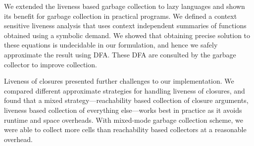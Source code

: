 \documentclass[preprint,9pt]{sigplanconf}
\begin{document}


We extended  the liveness  based garbage  collection to
lazy  languages  and  shown  its  benefit  for  garbage
collection in practical programs.  We defined a context
sensitive   liveness   analysis   that   uses   context
independent  summaries of  functions  obtained using  a
symbolic  demand.  We  showed  that  obtaining  precise
solution  to  these  equations is  undecidable  in  our
formulation, and hence we safely approximate the result
using  DFA.  These DFA  are  consulted  by the  garbage
collector to improve collection.

Liveness  of closures  presented further  challenges to
our implementation.  We  compared different approximate
strategies for handling liveness of closures, and found
that a  mixed strategy---reachability  based collection
of  closure  arguments,  liveness based  collection  of
everything else---works  best in practice as  it avoids
runtime and  space overheads.  With  mixed-mode garbage
collection scheme,  we were able to  collect more cells
than  reachability  based  collectors at  a  reasonable
overhead.
\end{document}
